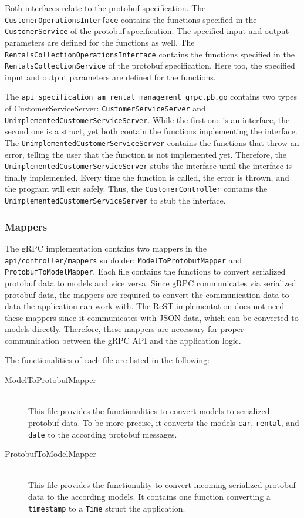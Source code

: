 Both interfaces relate to the protobuf specification.
The \texttt{CustomerOperationsInterface} contains the functions specified in the \texttt{CustomerService} of the protobuf specification.
The specified input and output parameters are defined for the functions as well.
The \texttt{RentalsCollectionOperationsInterface} contains the functions specified in the \texttt{RentalsCollectionService} of the protobuf specification.
Here too, the specified input and output parameters are defined for the functions.

The \texttt{api\_specification\_am\_rental\_management\_grpc.pb.go} contains two types of CustomerServiceServer: \texttt{CustomerServiceServer} and \texttt{UnimplementedCustomerServiceServer}.
While the first one is an interface, the second one is a struct, yet both contain the functions implementing the interface.
The \texttt{UnimplementedCustomerServiceServer} contains the functions that throw an error, telling the user that the function is not implemented yet.
Therefore, the \texttt{UnimplementedCustomerServiceServer} stubs the interface until the interface is finally implemented.
Every time the function is called, the error is thrown, and the program will exit safely.
Thus, the \texttt{CustomerController} contains the \texttt{UnimplementedCustomerServiceServer} to stub the interface.

\subsubsection*{Mappers}
The gRPC implementation contains two mappers in the \texttt{api/controller/mappers} subfolder: \texttt{ModelToProtobufMapper} and \texttt{ProtobufToModelMapper}.
Each file contains the functions to convert serialized protobuf data to models and vice versa.
Since gRPC communicates via serialized protobuf data, the mappers are required to convert the communication data to data the application can work with.
The ReST implementation does not need these mappers since it communicates with JSON data, which can be converted to models directly.
Therefore, these mappers are necessary for proper communication between the gRPC API and the application logic.

The functionalities of each file are listed in the following:
\begin{description}
    \item[ModelToProtobufMapper] \hfill \\
        This file provides the functionalities to convert models to serialized protobuf data.
        To be more precise, it converts the models \texttt{car}, \texttt{rental}, and \texttt{date} to the according protobuf messages.
    \item[ProtobufToModelMapper]  \hfill \\
        This file provides the functionality to convert incoming serialized protobuf data to the according models.
        It contains one function converting a \texttt{timestamp} to a \texttt{Time} struct the application.
\end{description}
